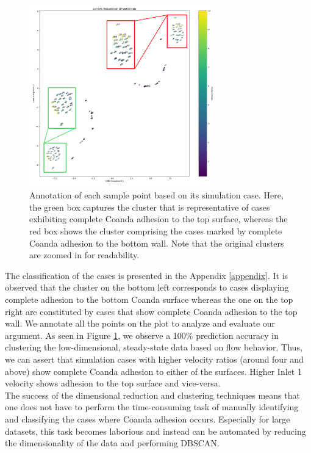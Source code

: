 \begin{figure}[ht]
    \centering
    \includegraphics[width=8cm]{images/Clustering/anno.png}
    \caption{Annotation of each sample point based on its simulation case. Here, the green box captures the cluster that is representative of cases exhibiting complete Coanda adhesion to the top surface, whereas the red box shows the cluster comprising the cases marked by complete Coanda adhesion to the bottom wall. Note that the original clusters are zoomed in for readability.}
    \label{anno}
    \end{figure}
The classification of the cases is presented in the Appendix \ref{appendix}. It is observed that the cluster on the bottom left corresponds to cases displaying complete adhesion to the bottom Coanda surface whereas the one on the top right are constituted by cases that show complete Coanda adhesion to the top wall. We annotate all the points on the plot to analyze and evaluate our argument. As seen in Figure \ref{anno}, we observe a 100\% prediction accuracy in clustering the low-dimensional, steady-state data based on flow behavior. Thus, we can assert that simulation cases with higher velocity ratios (around four and above) show complete Coanda adhesion to either of the surfaces. Higher Inlet 1 velocity shows adhesion to the top surface and vice-versa. \\
The success of the dimensional reduction and clustering techniques means that one does not have to perform the time-consuming task of manually identifying and classifying the cases where Coanda adhesion occurs. Especially for large datasets, this task becomes laborious and instead can be automated by reducing the dimensionality of the data and performing DBSCAN. \\
